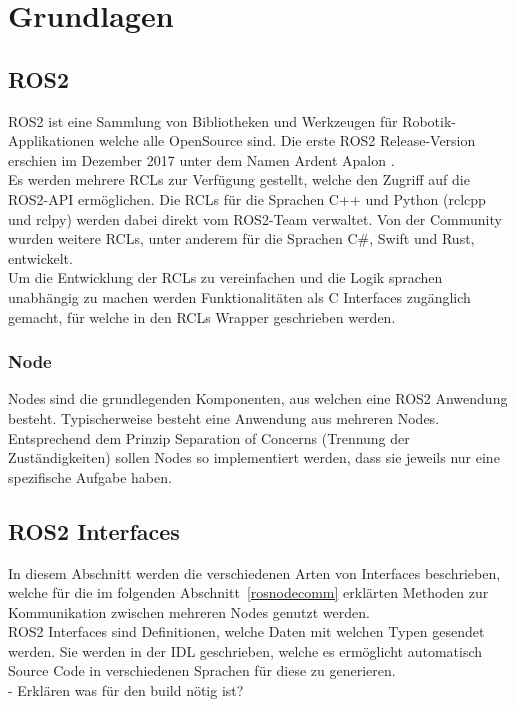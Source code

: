 \section {Grundlagen}
\subsection{ROS2}
\ac{ROS2} ist eine Sammlung von Bibliotheken und Werkzeugen für Robotik-Applikationen welche alle OpenSource sind.
Die erste \ac{ROS2} Release-Version erschien im Dezember 2017 unter dem Namen Ardent Apalon \citet{ros2docs}.\\
Es werden  mehrere \acp{RCL}  zur Verfügung gestellt, welche den Zugriff auf die \ac{ROS2}-API ermöglichen.
Die \acp{RCL} für die Sprachen C++ und Python (rclcpp und rclpy) werden dabei direkt vom \ac{ROS2}-Team verwaltet.
Von der Community wurden weitere \acp{RCL}, unter anderem für die Sprachen C\#, Swift und Rust, entwickelt.\\
Um die Entwicklung der \acp{RCL} zu vereinfachen und die Logik sprachen unabhängig zu machen werden Funktionalitäten als C Interfaces zugänglich gemacht, für welche in den \acp{RCL} Wrapper geschrieben werden.
\subsubsection{Node}
Nodes sind die grundlegenden Komponenten, aus welchen eine \ac{ROS2} Anwendung besteht.
Typischerweise besteht eine Anwendung aus mehreren Nodes.
Entsprechend dem Prinzip Separation of Concerns (Trennung der Zuständigkeiten) sollen Nodes so implementiert werden, dass sie jeweils nur eine spezifische Aufgabe haben.
\subsection{ROS2 Interfaces}
In diesem Abschnitt werden die verschiedenen Arten von Interfaces beschrieben, welche für die im folgenden Abschnitt~\ref{rosnodecomm} erklärten Methoden zur Kommunikation zwischen mehreren Nodes genutzt werden.\\
\ac{ROS2} Interfaces sind Definitionen, welche Daten mit welchen Typen gesendet werden.
Sie werden in der \ac{IDL} geschrieben, welche es ermöglicht automatisch Source Code in verschiedenen Sprachen für diese zu generieren.\\
- Erklären was für den build nötig ist?
